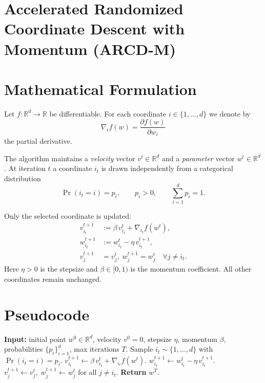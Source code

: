 \documentclass{article}
\newcommand{\R}{\mathbb{R}}
\begin{document}
\section*{Accelerated Randomized Coordinate Descent with Momentum (ARCD-M)}

\section*{Mathematical Formulation}
Let $f:\R^{d}\rightarrow\R$ be differentiable.  
For each coordinate $i\in\{1,\dots ,d\}$ we denote by 
\[
\nabla_i f(w)=\frac{\partial f(w)}{\partial w_i}
\]
the partial derivative.  

The algorithm maintains a \emph{velocity} vector $v^{t}\in\R^{d}$ and a \emph{parameter} vector $w^{t}\in\R^{d}$.  
At iteration $t$ a coordinate $i_{t}$ is drawn independently from a categorical distribution
\[
\Pr(i_t=i)=p_i,\qquad p_i>0,\qquad \sum_{i=1}^{d}p_i=1 .
\]

Only the selected coordinate is updated:
\[
\boxed{
\begin{aligned}
v^{t+1}_{i_t} &:= \beta\,v^{t}_{i_t}+ \nabla_{i_t} f(w^{t}) ,\\[4pt]
w^{t+1}_{i_t} &:= w^{t}_{i_t}-\eta\, v^{t+1}_{i_t},\\[4pt]
v^{t+1}_{j} &= v^{t}_{j},\; w^{t+1}_{j}=w^{t}_{j}\quad\forall j\neq i_t .
\end{aligned}}
\]
Here $\eta>0$ is the stepsize and $\beta\in[0,1)$ is the momentum coefficient.  
All other coordinates remain unchanged.

\section*{Pseudocode}
\begin{algorithm}[H]
\caption{ARCD-M}
\begin{algorithmic}[1]
\STATE \textbf{Input:} initial point $w^{0}\in\R^{d}$, velocity $v^{0}=0$, stepsize $\eta$, momentum $\beta$, probabilities $\{p_i\}_{i=1}^{d}$, max iterations $T$.
    \STATE Sample $i_t\sim\{1,\dots ,d\}$ with $\Pr(i_t=i)=p_i$.
    \STATE $v^{t+1}_{i_t}\gets \beta\,v^{t}_{i_t}+ \nabla_{i_t} f(w^{t})$.
    \STATE $w^{t+1}_{i_t}\gets w^{t}_{i_t}-\eta\,v^{t+1}_{i_t}$.
    \STATE $v^{t+1}_{j}\gets v^{t}_{j},\; w^{t+1}_{j}\gets w^{t}_{j}$ for all $j\neq i_t$.
\ENDFOR
\STATE \textbf{Return} $w^{T}$.
\end{algorithmic}
\end{algorithm}
\end{document}
